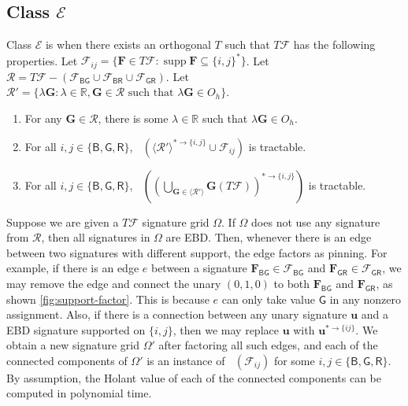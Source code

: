 \documentclass[11pt]{article}
\DeclareMathOperator{\holbs}{Holant^*_2}
\DeclareMathOperator{\supp}{supp}
\newcommand{\db}{\mathsf{B}}
\newcommand{\dg}{\mathsf{G}}
\newcommand{\dr}{\mathsf{R}}
\newcommand{\octgroup}{O_h}
\newcommand{\domres}[1]{
  ^{*\to\{#1\}}
}
\newcommand{\strspt}{\textsf{EBD}\xspace}
\newcommand{\tractBGGRBR}{$\mathscr{E}$\xspace}
\begin{document}
\subsection{Class \texorpdfstring{\tractBGGRBR}{E}}
Class \tractBGGRBR is when there exists an orthogonal $T$ such that $T \mathcal{F}$ has the following properties.
Let $\mathcal{F}_{ij} = \{\mathbf{F} \in T \mathcal{F} : \supp \mathbf{F} \subseteq \{i, j\}^*\}$.
Let $\mathcal{R} = T \mathcal{F} - (\mathcal{F}_{\db \dg} \cup \mathcal{F}_{\db \dr} \cup \mathcal{F}_{\dg \dr})$.
Let 
$\mathcal{R}' = \{ \lambda \mathbf{G} : \lambda \in \mathbb{R}, \mathbf{G} \in \mathcal{R} \text{ such that } \lambda \mathbf{G} \in \octgroup \}$.
\begin{enumerate}
        \item For any $\mathbf{G} \in \mathcal{R}$, there is some $\lambda \in \mathbb{R}$ such that $\lambda \mathbf{G} \in \octgroup$.
        \item For all $i, j \in \{\db, \dg, \dr\}$, $\holbs( \langle \mathcal{R}' \rangle\domres{i, j} \cup \mathcal{F}_{ij})$ is tractable.
\item For all $i, j \in \{ \db, \dg, \dr\}$, 
        $\holbs( (\bigcup_{\mathbf{G} \in \langle \mathcal{R}' \rangle} \mathbf{G} (T \mathcal{F})) \domres{i, j})$ is tractable.
      \end{enumerate}
Suppose we are given a $T \mathcal{F}$ signature grid $\Omega$.
If $\Omega$ does not use any signature from $\mathcal{R}$, then all signatures in $\Omega$ are \strspt.
Then, whenever there is an edge between two signatures with different support, the edge factors as pinning.
For example, if there is an edge $e$ between a signature $\mathbf{F}_{\db \dg} \in \mathcal{F}_{\db \dg}$ and $\mathbf{F}_{\dg \dr} \in \mathcal{F}_{\dg \dr}$,
we may remove the edge and connect the unary $(0, 1, 0)$ to both $\mathbf{F}_{\db \dg}$ and $\mathbf{F}_{\dg \dr}$, as shown \cref{fig:support-factor}.
This is because $e$ can only take value $\dg$ in any nonzero assignment.
Also, if there is a connection between any unary signature $\mathbf{u}$ and a \strspt signature supported on $\{i, j\}$, then we may replace $\mathbf{u}$ with $\mathbf{u}\domres{ij}$.
We obtain a new signature grid $\Omega'$ after factoring all such edges, and each of the connected components of $\Omega'$ is an instance of $\holbs(\mathcal{F}_{ij})$ for some $i, j \in \{\db, \dg, \dr\}$.
By assumption, the Holant value of each of the connected components can be computed in polynomial time.
\end{document}
